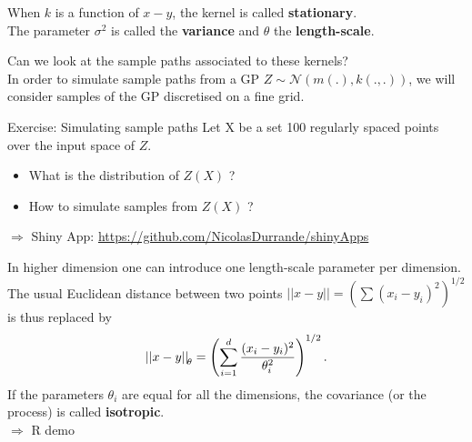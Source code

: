 \begin{frame}{}
\vspace{2mm}
\normalsize
When $k$ is a function of $x-y$, the kernel is called \textbf{stationary}. \\
The parameter $\sigma^2$ is called the \textbf{variance} and $\theta$ the \textbf{length-scale}.
\end{frame}

\begin{frame}{}
Can we look at the sample paths associated to these kernels?\\
\vspace{5mm}
In order to simulate sample paths from a GP $Z \sim \mathcal{N}(m(.),k(.,.))$, we will consider samples of the GP discretised on a fine grid.
\vspace{5mm}
\begin{exampleblock}{Exercise: Simulating sample paths}
Let X be a set 100 regularly spaced points over the input space of $Z$.
\begin{itemize}
	\item What is the distribution of $Z(X)$ ?
	\item How to simulate samples from $Z(X)$ ?
\end{itemize}
\end{exampleblock}
\vspace{5mm}
$\Rightarrow$ Shiny App: \url{https://github.com/NicolasDurrande/shinyApps}
\end{frame}

\begin{frame}{}
In higher dimension one can introduce one length-scale parameter per dimension. The usual Euclidean distance between two points $|| x-y || = ( \sum (x_i-y_i)^2)^{1/2}$ is thus replaced by
\begin{equation*}
	{|| x-y ||}_{\! \theta} = \left( \sum_{i=1}^d \frac{(x_i-y_i)^2}{\theta_i^2} \right)^{1/2}.
\end{equation*}
If the parameters $\theta_i$ are equal for all the dimensions, the covariance (or the process) is called \textbf{isotropic}.\\
\vspace{5mm}
$\Rightarrow$ R demo
\end{frame}

